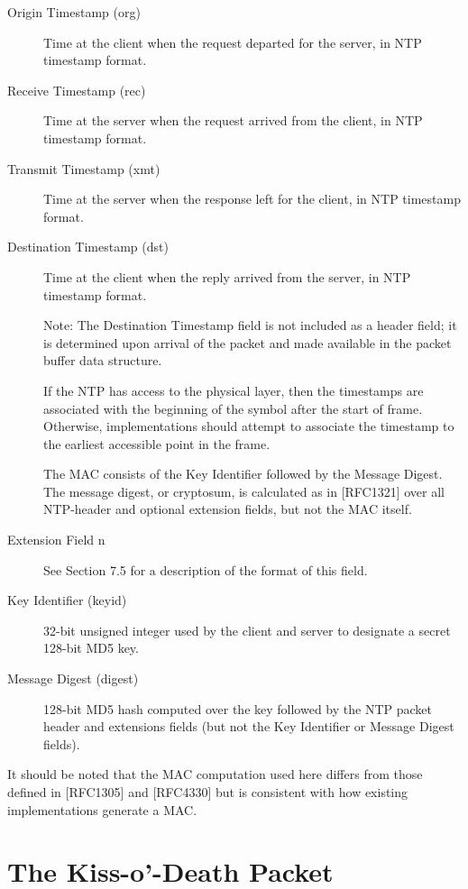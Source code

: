 \begin{description}
\item[Origin Timestamp (org)] Time at the client when the request departed
for the server, in NTP timestamp format.

\item[Receive Timestamp (rec)] Time at the server when the request arrived
from the client, in NTP timestamp format.

\item[Transmit Timestamp (xmt)] Time at the server when the response left
for the client, in NTP timestamp format.

\item[Destination Timestamp (dst)] Time at the client when the reply
arrived from the server, in NTP timestamp format.

Note: The Destination Timestamp field is not included as a header
field; it is determined upon arrival of the packet and made available
in the packet buffer data structure.

If the NTP has access to the physical layer, then the timestamps are
associated with the beginning of the symbol after the start of frame.
Otherwise, implementations should attempt to associate the timestamp
to the earliest accessible point in the frame.

The MAC consists of the Key Identifier followed by the Message
Digest. The message digest, or cryptosum, is calculated as in
[RFC1321] over all NTP-header and optional extension fields, but not
the MAC itself.

\item[Extension Field n] See Section 7.5 for a description of the format of
this field.

\item[Key Identifier (keyid)] 32-bit unsigned integer used by the client
and server to designate a secret 128-bit MD5 key.

\item[Message Digest (digest)] 128-bit MD5 hash computed over the key
followed by the NTP packet header and extensions fields (but not the
Key Identifier or Message Digest fields).

\end{description}

It should be noted that the MAC computation used here differs from
those defined in [RFC1305] and [RFC4330] but is consistent with how
existing implementations generate a MAC.

\section{The Kiss-o’-Death Packet}

